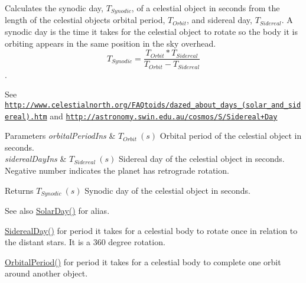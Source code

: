 Calculates the synodic day, $T_{Synodic}$, of a celestial object in seconds from the length of the celestial object\textquotesingle{}s orbital period, $T_{Orbit}$, and sidereal day, $T_{Sidereal}$. A synodic day is the time it takes for the celestial object to rotate so the body it is orbiting appears in the same position in the sky overhead. \[ T_{Synodic}=\dfrac{T_{Orbit} * T_{Sidereal}}{T_{Orbit} - T_{Sidereal}}\]. 

See \href{http://www.celestialnorth.org/FAQtoids/dazed_about_days_(solar_and_sidereal).htm}{\tt http\+://www.\+celestialnorth.\+org/\+F\+A\+Qtoids/dazed\+\_\+about\+\_\+days\+\_\+(solar\+\_\+and\+\_\+sidereal).\+htm} and \href{http://astronomy.swin.edu.au/cosmos/S/Sidereal+Day}{\tt http\+://astronomy.\+swin.\+edu.\+au/cosmos/\+S/\+Sidereal+\+Day}


\begin{DoxyParams}{Parameters}
{\em orbital\+Period\+Ins} & $ T_{Orbit}\ (s)$ Orbital period of the celestial object in seconds. \\
\hline
{\em sidereal\+Day\+Ins} & $ T_{Sidereal}\ (s)$ Sidereal day of the celestial object in seconds. Negative number indicates the planet has retrograde rotation. \\
\hline
\end{DoxyParams}
\begin{DoxyReturn}{Returns}
$ T_{Synodic}\ (s)$ Synodic day of the celestial object in seconds. 
\end{DoxyReturn}
\begin{DoxySeeAlso}{See also}
\mbox{\hyperlink{group___e_g_x_phys-_astrophysic-_solar_day_gae321e0dd0c031a57c45b15dc819635e0}{Solar\+Day()}} for alias. 

\mbox{\hyperlink{group___e_g_x_phys-_astrophysic-_sidereal_day_ga587900d5fc755228c1bb5121cd7965c6}{Sidereal\+Day()}} for period it takes for a celestial body to rotate once in relation to the distant stars. It is a 360 degree rotation. 

\mbox{\hyperlink{group___e_g_x_phys-_astrophysic-_orbital_period_ga76aac7afe3b7a30a785259e9eeb0c139}{Orbital\+Period()}} for period it takes for a celestial body to complete one orbit around another object. 
\end{DoxySeeAlso}
